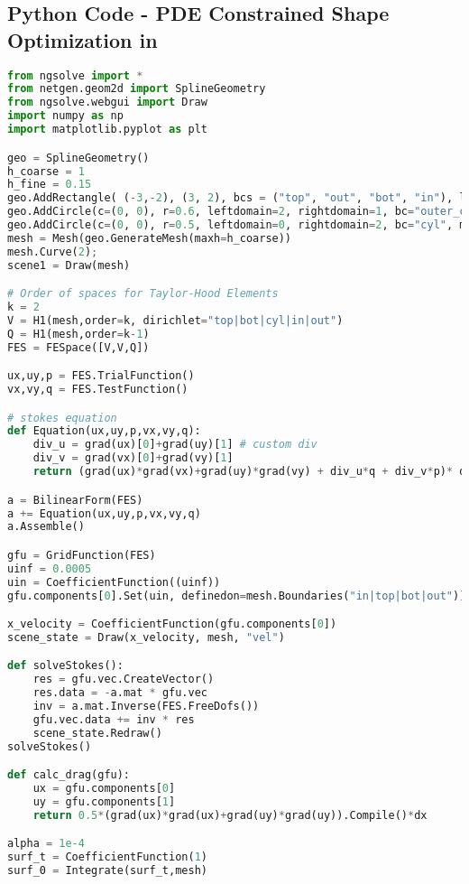 \begin{appendix}
\addappheadtotoc
\section{Python Code - PDE Constrained Shape Optimization in }
\label{app_a}


\begin{lstlisting}[language=Python, title=NGSolve Shape Optimization Code in Python, label=final_code]
from ngsolve import *
from netgen.geom2d import SplineGeometry
from ngsolve.webgui import Draw
import numpy as np
import matplotlib.pyplot as plt

geo = SplineGeometry()
h_coarse = 1
h_fine = 0.15
geo.AddRectangle( (-3,-2), (3, 2), bcs = ("top", "out", "bot", "in"), leftdomain=1, rightdomain=0, maxh=h_coarse) 
geo.AddCircle(c=(0, 0), r=0.6, leftdomain=2, rightdomain=1, bc="outer_cylinder", maxh=h_fine) 
geo.AddCircle(c=(0, 0), r=0.5, leftdomain=0, rightdomain=2, bc="cyl", maxh=h_fine) 
mesh = Mesh(geo.GenerateMesh(maxh=h_coarse))
mesh.Curve(2);
scene1 = Draw(mesh)

# Order of spaces for Taylor-Hood Elements
k = 2
V = H1(mesh,order=k, dirichlet="top|bot|cyl|in|out")
Q = H1(mesh,order=k-1)
FES = FESpace([V,V,Q])

ux,uy,p = FES.TrialFunction()
vx,vy,q = FES.TestFunction()

# stokes equation
def Equation(ux,uy,p,vx,vy,q):
    div_u = grad(ux)[0]+grad(uy)[1] # custom div
    div_v = grad(vx)[0]+grad(vy)[1]
    return (grad(ux)*grad(vx)+grad(uy)*grad(vy) + div_u*q + div_v*p)* dx

a = BilinearForm(FES)
a += Equation(ux,uy,p,vx,vy,q)
a.Assemble()

gfu = GridFunction(FES)
uinf = 0.0005
uin = CoefficientFunction((uinf))
gfu.components[0].Set(uin, definedon=mesh.Boundaries("in|top|bot|out"))

x_velocity = CoefficientFunction(gfu.components[0])
scene_state = Draw(x_velocity, mesh, "vel")

def solveStokes():
    res = gfu.vec.CreateVector()
    res.data = -a.mat * gfu.vec
    inv = a.mat.Inverse(FES.FreeDofs())
    gfu.vec.data += inv * res
    scene_state.Redraw()
solveStokes()

def calc_drag(gfu):
    ux = gfu.components[0]
    uy = gfu.components[1]
    return 0.5*(grad(ux)*grad(ux)+grad(uy)*grad(uy)).Compile()*dx

alpha = 1e-4
surf_t = CoefficientFunction(1)
surf_0 = Integrate(surf_t,mesh)


\end{lstlisting}
\end{appendix}
